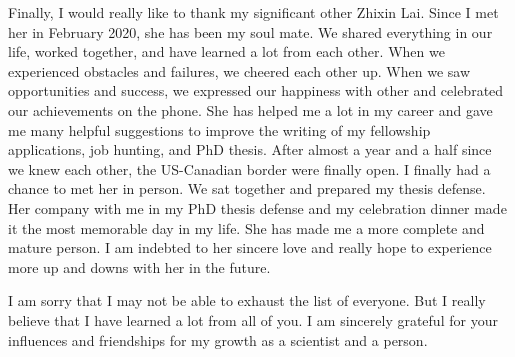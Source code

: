 Finally, I would really like to thank my significant other Zhixin Lai. Since I met her in February 2020, she has been my soul mate. We shared everything in our life, worked together, and have learned a lot from each other. When we experienced obstacles and failures, we cheered each other up. When we saw opportunities and success, we expressed our happiness with other and celebrated our achievements on the phone. She has helped me a lot in my career and gave me many helpful suggestions to improve the writing of my fellowship applications, job hunting, and PhD thesis. After almost a year and a half since we knew each other, the US-Canadian border were finally open. I finally had a chance to met her in person. We sat together and prepared my thesis defense. Her company with me in my PhD thesis defense and my celebration dinner made it the most memorable day in my life. She has made me a more complete and mature person. I am indebted to her sincere love and really hope to experience more up and downs with her in the future.



















I am sorry that I may not be able to exhaust the list of everyone. But I really believe that I have learned a lot from all of you. I am sincerely grateful for your influences and friendships for my growth as a scientist and a person. 

